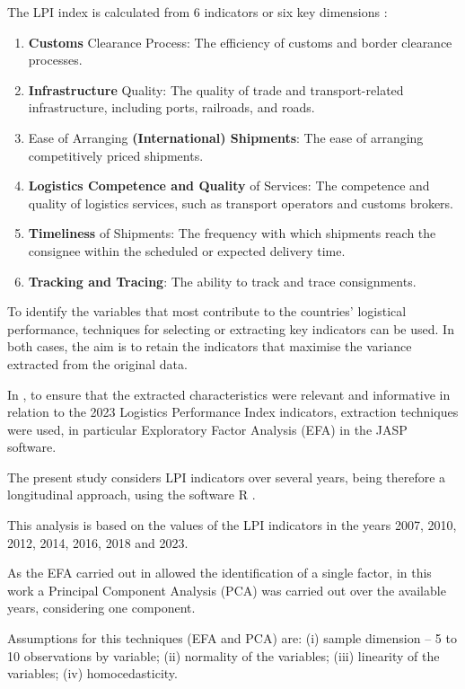 \documentclass[sigconf]{acmart}
\begin{document}
The LPI \cite{WB} index is calculated from 6 indicators or six key dimensions \cite{WBreport2016,WBreport2018}:
\begin{enumerate}
    \item \textbf{Customs} Clearance Process: The efficiency of customs and border clearance processes.
    \item \textbf{Infrastructure} Quality: The quality of trade and transport-related infrastructure, including ports, railroads, and roads.
    \item Ease of Arranging \textbf{(International) Shipments}: The ease of arranging competitively priced shipments.
    \item \textbf{Logistics Competence and Quality } of Services: The competence and quality of logistics services, such as transport operators and customs brokers.
    \item \textbf{Timeliness} of Shipments: The frequency with which shipments reach the consignee within the scheduled or expected delivery time.
    \item \textbf{Tracking and Tracing}: The ability to track and trace consignments.
\end{enumerate}

To identify the variables that most contribute  to the countries' logistical performance, techniques for selecting or extracting key indicators can be used. In both cases, the aim is to retain the indicators that maximise the variance extracted from the original data.

In \cite{correiaICIE}, to ensure that the extracted characteristics were relevant and informative in relation to the 2023 Logistics Performance Index indicators, extraction techniques were used, in particular Exploratory Factor Analysis (EFA) in the JASP \cite{JASP} software.

The present study considers LPI indicators over several years, being therefore a longitudinal approach, using the software R \cite{R}.

This analysis is based on the values of the LPI \cite{BM} indicators in the years 2007, 2010, 2012, 2014, 2016, 2018 and 2023.

As the EFA carried out in \cite{correiaICIE} allowed the identification of a single factor, in this work a Principal Component Analysis (PCA) was carried out over the available years, considering one component.

Assumptions for this techniques (EFA and PCA)  are: (i) sample dimension -- 5 to 10 observations by variable; (ii) normality of the variables; (iii) linearity of the variables; (iv) homocedasticity.
\end{document}
